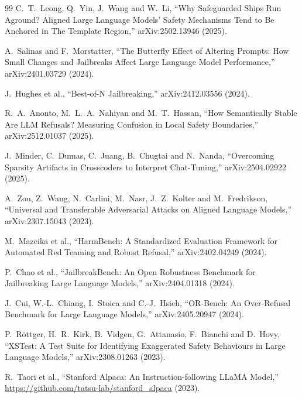 \documentclass[11pt]{article}
\begin{document}
\begin{thebibliography}{99}
C.~T.~Leong, Q.~Yin, J.~Wang and W.~Li,
``Why Safeguarded Ships Run Aground? Aligned Large Language Models' Safety Mechanisms Tend to Be Anchored in The Template Region,''
arXiv:2502.13946 (2025).

A.~Salinas and F.~Morstatter,
``The Butterfly Effect of Altering Prompts: How Small Changes and Jailbreaks Affect Large Language Model Performance,''
arXiv:2401.03729 (2024).

J.~Hughes et al.,
``Best-of-N Jailbreaking,''
arXiv:2412.03556 (2024).

R.~A.~Anonto, M.~L.~A.~Nahiyan and M.~T.~Hassan,
``How Semantically Stable Are LLM Refusals? Measuring Confusion in Local Safety Boundaries,''
arXiv:2512.01037 (2025).

J.~Minder, C.~Dumas, C.~Juang, B.~Chugtai and N.~Nanda,
``Overcoming Sparsity Artifacts in Crosscoders to Interpret Chat-Tuning,''
arXiv:2504.02922 (2025).

A.~Zou, Z.~Wang, N.~Carlini, M.~Nasr, J.~Z.~Kolter and M.~Fredrikson,
``Universal and Transferable Adversarial Attacks on Aligned Language Models,''
arXiv:2307.15043 (2023).

M.~Mazeika et al.,
``HarmBench: A Standardized Evaluation Framework for Automated Red Teaming and Robust Refusal,''
arXiv:2402.04249 (2024).

P.~Chao et al.,
``JailbreakBench: An Open Robustness Benchmark for Jailbreaking Large Language Models,''
arXiv:2404.01318 (2024).

J.~Cui, W.-L.~Chiang, I.~Stoica and C.-J.~Hsieh,
``OR-Bench: An Over-Refusal Benchmark for Large Language Models,''
arXiv:2405.20947 (2024).

P.~R\"ottger, H.~R.~Kirk, B.~Vidgen, G.~Attanasio, F.~Bianchi and D.~Hovy,
``XSTest: A Test Suite for Identifying Exaggerated Safety Behaviours in Large Language Models,''
arXiv:2308.01263 (2023).

R.~Taori et al.,
``Stanford Alpaca: An Instruction-following LLaMA Model,''
\url{https://github.com/tatsu-lab/stanford_alpaca} (2023).

\end{thebibliography}
\end{document}
